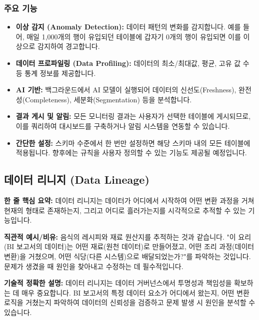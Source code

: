 \documentclass[11pt,a4paper]{article}
\begin{document}
\subsubsection*{주요 기능}
\begin{itemize}
    \item \textbf{이상 감지 (Anomaly Detection):} 데이터 패턴의 변화를 감지합니다. 예를 들어, 매일 1,000개의 행이 유입되던 테이블에 갑자기 0개의 행이 유입되면 이를 이상으로 감지하여 경고합니다.
    \item \textbf{데이터 프로파일링 (Data Profiling):} 데이터의 최소/최대값, 평균, 고유 값 수 등 통계 정보를 제공합니다.
    \item \textbf{AI 기반:} 백그라운드에서 AI 모델이 실행되어 데이터의 신선도(Freshness), 완전성(Completeness), 세분화(Segmentation) 등을 분석합니다.
    \item \textbf{결과 게시 및 알림:} 모든 모니터링 결과는 사용자가 선택한 테이블에 게시되므로, 이를 쿼리하여 대시보드를 구축하거나 알림 시스템을 연동할 수 있습니다.
    \item \textbf{간단한 설정:} 스키마 수준에서 한 번만 설정하면 해당 스키마 내의 모든 테이블에 적용됩니다. 향후에는 규칙을 사용자 정의할 수 있는 기능도 제공될 예정입니다.
\end{itemize}

\newpage
\subsection*{데이터 리니지 (Data Lineage)}

\begin{keyconceptbox}
\textbf{한 줄 핵심 요약:} 데이터 리니지는 데이터가 어디에서 시작하여 어떤 변환 과정을 거쳐 현재의 형태로 존재하는지, 그리고 어디로 흘러가는지를 시각적으로 추적할 수 있는 기능입니다.
\end{keyconceptbox}

\textbf{직관적 예시/비유:}
음식의 레시피와 재료 원산지를 추적하는 것과 같습니다. "이 요리(BI 보고서의 데이터)는 어떤 재료(원천 데이터)로 만들어졌고, 어떤 조리 과정(데이터 변환)을 거쳤으며, 어떤 식당(다른 시스템)으로 배달되었는가?"를 파악하는 것입니다. 문제가 생겼을 때 원인을 찾아내고 수정하는 데 필수적입니다.

\textbf{기술적 정확한 설명:}
데이터 리니지는 데이터 거버넌스에서 투명성과 책임성을 확보하는 데 매우 중요합니다. BI 보고서의 특정 데이터 요소가 어디에서 왔는지, 어떤 변환 로직을 거쳤는지 파악하여 데이터의 신뢰성을 검증하고 문제 발생 시 원인을 분석할 수 있습니다.
\end{document}
